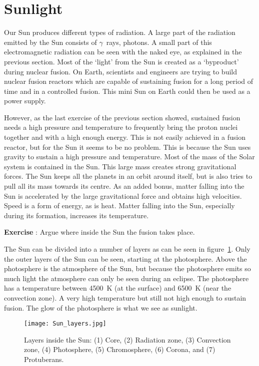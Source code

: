 \section{Sunlight}
Our Sun produces different types of radiation. A large part of the radiation emitted by the Sun consists of $\gamma$~rays, photons. A small part of this electromagnetic radiation can be seen with the naked eye, as explained in the previous section. Most of the `light' from the Sun is created as a `byproduct' during nuclear fusion. On Earth, scientists and engineers are trying to build nuclear fusion reactors which are capable of sustaining fusion for a long period of time and in a controlled fusion. This mini Sun on Earth could then be used as a power supply.

However, as the last exercise of the previous section showed, sustained fusion needs a high pressure and temperature to frequently bring the proton nuclei together and with a high enough energy. This is not easily achieved in a fusion reactor, but for the Sun it seems to be no problem. This is because the Sun uses gravity to sustain a high pressure and temperature. Most of the mass of the Solar system is contained in the Sun. This large mass creates strong gravitational forces. The Sun keeps all the planets in an orbit around itself, but is also tries to pull all its mass towards its centre. As an added bonus, matter falling into the Sun is accelerated by the large gravitational force and obtains high velocities. Speed is a form of energy, as is heat. Matter falling into the Sun, especially during its formation, increases its temperature.

\begin{shaded}
\textbf{Exercise \theExercise {}} : Argue where inside the Sun the fusion takes place.\end{shaded}

The Sun can be divided into a number of layers as can be seen in figure~\ref{fig:sun_layers}. Only the outer layers of the Sun can be seen, starting at the photosphere. Above the photosphere is the atmosphere of the Sun, but because the photosphere emits so much light the atmosphere can only be seen during an eclipse. The photosphere has a temperature between 4500~K (at the surface) and 6500~K (near the convection zone). A very high temperature but still not high enough to sustain fusion. The glow of the photosphere is what we see as sunlight.

\begin{figure}\begin{center}
\texttt{[image: Sun\_layers.jpg]}
\caption{Layers inside the Sun: (1) Core, (2) Radiation zone, (3) Convection zone, (4) Photosphere, (5) Chromosphere, (6) Corona, and (7) Protuberans.}\label{fig:sun_layers}
\end{center}\end{figure}

